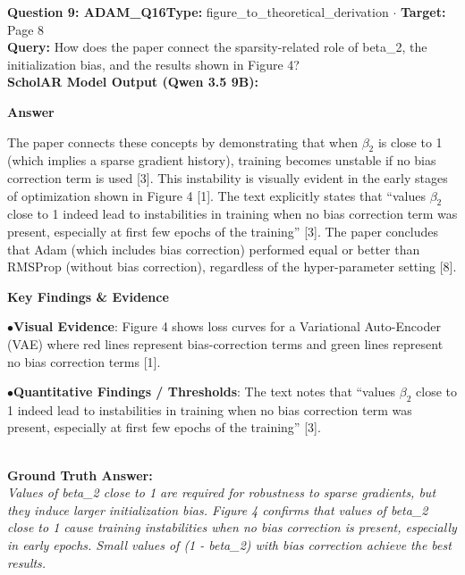 \documentclass[10pt,a4paper]{article}
\begin{document}
\begin{tcolorbox}[questionbox]
{\noindent\bfseries\large\color{navy} Question 9: ADAM\_Q16}\hfill {\footnotesize\color{darkteal}\textbf{Type:} figure\_to\_theoretical\_derivation $\cdot$ \textbf{Target:} Page 8}\\[4pt]
{\noindent\bfseries\color{accentblue} Query: } How does the paper connect the sparsity-related role of beta\_2, the initialization bias, and the results shown in Figure 4?\\[6pt]
{\noindent\bfseries\color{navy} ScholAR Model Output (Qwen 3.5 9B):}\\[2pt]
{\small \noindent \textbf{Answer}\par\vspace{3pt}The paper connects these concepts by demonstrating that when $\beta_2$ is close to 1 (which implies a sparse gradient history), training becomes unstable if no bias correction term is used [3]. This instability is visually evident in the early stages of optimization shown in Figure 4 [1]. The text explicitly states that ``values $\beta_2$ close to 1 indeed lead to instabilities in training when no bias correction term was present, especially at first few epochs of the training'' [3].  The paper concludes that Adam (which includes bias correction) performed equal or better than RMSProp (without bias correction), regardless of the hyper-parameter setting [8].\par\vspace{3pt}\noindent \textbf{Key Findings \& Evidence}\par\vspace{3pt}\noindent\hspace*{8pt}$\bullet$\hspace*{4pt}\textbf{Visual Evidence}: Figure 4 shows loss curves for a Variational Auto-Encoder (VAE) where red lines represent bias-correction terms and green lines represent no bias correction terms [1].\par\vspace{3pt}\noindent\hspace*{8pt}$\bullet$\hspace*{4pt}\textbf{Quantitative Findings / Thresholds}: The text notes that ``values $\beta_2$ close to 1 indeed lead to instabilities in training when no bias correction term was present, especially at first few epochs of the training'' [3].}\\[6pt]
{\noindent\bfseries\color{darkteal} Ground Truth Answer:}\\[2pt]
{\small\itshape Values of beta\_2 close to 1 are required for robustness to sparse gradients, but they induce larger initialization bias. Figure 4 confirms that values of beta\_2 close to 1 cause training instabilities when no bias correction is present, especially in early epochs. Small values of (1 - beta\_2) with bias correction achieve the best results.}\\[4pt]

\end{tcolorbox}
\end{document}
